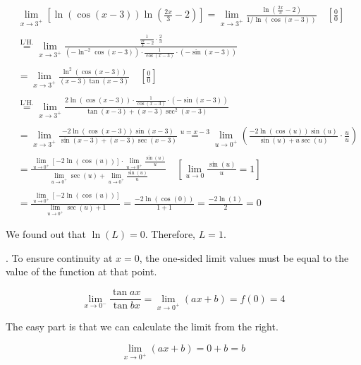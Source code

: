 \documentclass{article}
\begin{document}
\begin{align*}&\lim_{x\to3^+}\left[ \ln\left(\cos(x-3)\right)\ln\left(\frac{2x}{3}-2\right)\right] = \lim_{x\to3^+}\frac{\ln\left(\frac{2x}{3}-2\right)}{1/ \ln\left(\cos(x-3)\right)} \quad \left[\frac00\right] \\\\&\overset{\text{L'H.}}{=} \lim_{x\to3^+}\frac{\displaystyle\frac1{\frac{2x}{3} - 2}\cdot \frac{2}{3}}{\displaystyle \left(-\ln^{-2}\displaystyle \cos(x-3)\right)\cdot \frac{1}{\cos(x-3)}\cdot(-\sin(x-3))}\\\\&= \lim_{x\to3^+} \displaystyle\frac{\ln^2(\cos(x-3))}{(x-3)\tan(x-3)} \quad\left[\frac00\right]\\\\&\overset{\text{L'H.}}{=} \lim_{x\to3^+} \frac{\displaystyle2\ln(\cos(x-3))\cdot\frac{1}{\cos(x-3)}\cdot(-\sin(x-3))}{\tan(x-3) + (x-3)\sec^2(x-3)}\\\\&=\lim_{x\to3^+}\frac{\displaystyle-2\ln(\cos(x-3))\sin(x-3)}{\sin(x-3) + (x-3)\sec(x-3)} \overset{u=x-3}{=} \lim_{u\to0^+}\left(\frac{\displaystyle-2\ln(\cos(u))\sin(u)}{\sin(u) + u\sec(u)} \cdot\frac{u}{u}\right)\\\\& = \frac{\displaystyle\lim_{u\to0^+}[-2\ln(\cos(u))]\cdot \lim_{u\to0^+}\frac{\sin(u)}{u}}{\displaystyle\lim_{u\to0^+}\sec(u)+\lim_{u\to0^+}\frac{\sin(u)}{u}}\quad \left[\lim_{u\to0} \frac{\sin(u)}u=1\right]\\\\&=\frac{\displaystyle\lim_{u\to0^+}[-2\ln(\cos(u))]}{\displaystyle\lim_{u\to0^+}\sec(u)+1}  =\frac{-2\ln(\cos(0))}{1+1} =\frac{-2\ln(1)}{2} = 0\end{align*}

\hfill

\noindent We found out that $\ln(L) = 0$. Therefore, $\boxed{L = 1}$.

\newpage

. To ensure continuity at $x=0$, the one-sided limit values must be equal to the value of the function at that point.

\[\lim_{x\to0^-}\frac{\tan ax}{\tan bx}=\lim_{x\to0^+}(ax+b)=f(0)=4\]

\hfill

\noindent The easy part is that we can calculate the limit from the right.

\[\lim_{x\to0^+} (ax+b) = 0+b = b\]

\hfill
\end{document}

